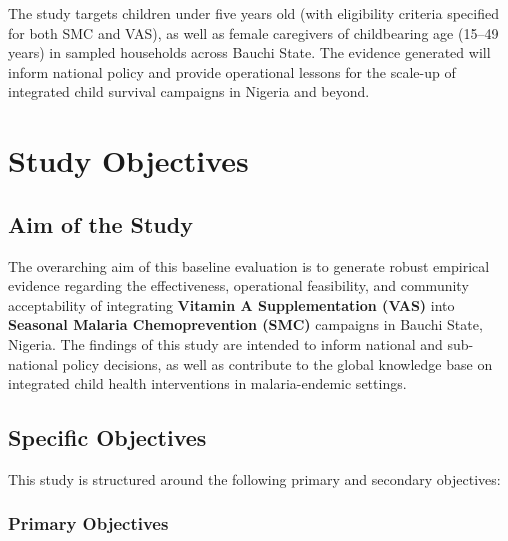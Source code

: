 \documentclass[
  11pt,
]{report}
\begin{document}
The study targets children under five years old (with eligibility
criteria specified for both SMC and VAS), as well as female caregivers
of childbearing age (15--49 years) in sampled households across Bauchi
State. The evidence generated will inform national policy and provide
operational lessons for the scale-up of integrated child survival
campaigns in Nigeria and beyond.

\chapter{Study Objectives}\label{study-objectives}

\section{Aim of the Study}\label{aim-of-the-study}

The overarching aim of this baseline evaluation is to generate robust
empirical evidence regarding the effectiveness, operational feasibility,
and community acceptability of integrating \textbf{Vitamin A
Supplementation (VAS)} into \textbf{Seasonal Malaria Chemoprevention
(SMC)} campaigns in Bauchi State, Nigeria. The findings of this study
are intended to inform national and sub-national policy decisions, as
well as contribute to the global knowledge base on integrated child
health interventions in malaria-endemic settings.

\section{Specific Objectives}\label{specific-objectives}

This study is structured around the following primary and secondary
objectives:

\subsection{Primary Objectives}\label{primary-objectives}
\end{document}
